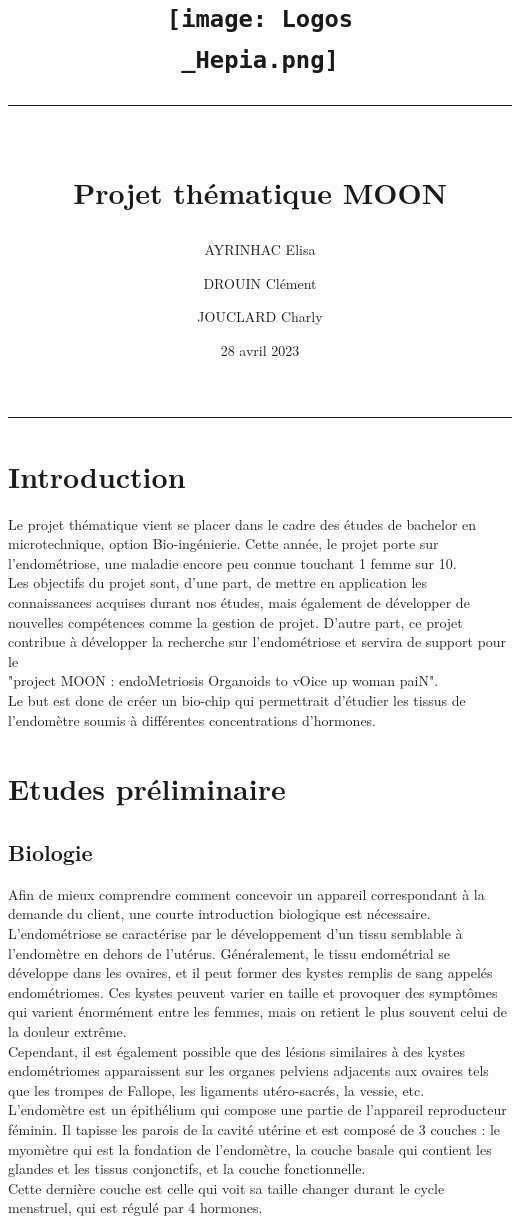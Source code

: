 \documentclass[a4paper, 11pt]{article}
\title{
    \vspace{-2.5cm}
    \centering\texttt{[image: Logos\\\_Hepia.png]}\\
    \centering\rule{17cm}{0.1mm}\vspace*{0.4in}\\
    \centering Projet thématique MOON}
\author[1]{AYRINHAC Elisa}
\author[2]{DROUIN Clément}
\author[3]{JOUCLARD Charly}
\affil[1]{HEPIA, MT2, elisa.ayrinhac@hes-so.ch}
\affil[2]{HEPIA, MT2, clement.drouin@hes-so.ch}
\affil[3]{HEPIA, MT2, charly.jouclard@hes-so.ch}
\date{28 avril 2023}
\begin{document}
\maketitle
\thispagestyle{empty}
\begin{center}
    \rule{\textwidth}{0.1mm}
\end{center}
\vspace{-1cm}
\section*{Introduction}
Le projet thématique vient se placer dans le cadre des études de bachelor en microtechnique, option Bio-ingénierie. Cette année, le projet porte sur l'endométriose, une maladie encore peu connue touchant 1 femme sur 10.\\
Les objectifs du projet sont, d'une part, de mettre en application les connaissances acquises durant nos études, mais également de développer de nouvelles compétences comme la gestion de projet.
D'autre part, ce projet contribue à développer la recherche sur l'endométriose et servira de support pour le \\
"project MOON : endoMetriosis Organoids to vOice up woman paiN".\\
Le but est donc de créer un bio-chip qui permettrait d'étudier les tissus de l'endomètre soumis à différentes concentrations d'hormones.
\newpage
\tableofcontents
\newpage
\section{Etudes préliminaire}
\subsection{Biologie}
Afin de mieux comprendre comment concevoir un appareil correspondant à la demande du client, une courte introduction biologique est nécessaire.\\
L'endométriose se caractérise par le développement d'un tissu semblable à l'endomètre en dehors de l'utérus. Généralement, le tissu endométrial se développe dans les ovaires, et il peut former des kystes remplis de sang appelés endométriomes. Ces kystes peuvent varier en taille et provoquer des symptômes qui varient énormément entre les femmes, mais on retient le plus souvent celui de la douleur extrême.\\
Cependant, il est également possible que des lésions similaires à des kystes endométriomes apparaissent sur les organes pelviens adjacents aux ovaires tels que les trompes de Fallope, les ligaments utéro-sacrés, la vessie, etc.\\
L'endomètre est un épithélium qui compose une partie de l'appareil reproducteur féminin. Il tapisse les parois de la cavité utérine et est composé de 3 couches : le myomètre qui est la fondation de l'endomètre, la couche basale qui contient les glandes et les tissus conjonctifs, et la couche fonctionnelle.\\
Cette dernière couche est celle qui voit sa taille changer durant le cycle menstruel, qui est régulé par 4 hormones.
\end{document}
